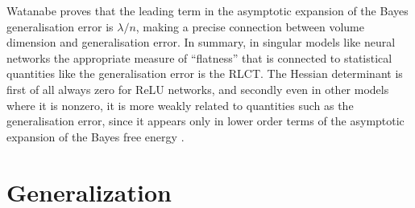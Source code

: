 \documentclass{article} %
\begin{document}
Watanabe proves that the leading term in the asymptotic expansion of the Bayes generalisation error is $\lambda/n$, making a precise connection between volume dimension and generalisation error. In summary, in singular models like neural networks the appropriate measure of ``flatness'' that is connected to statistical quantities like the generalisation error is the RLCT. The Hessian determinant is first of all always zero for ReLU networks, and secondly even in other models where it is nonzero, it is more weakly related to quantities such as the generalisation error, since it appears only in lower order terms of the asymptotic expansion of the Bayes free energy \citep[\S 3.1]{Balasubramanian:1996cond.mat..1030B}. 



\section{Generalization}\label{section:gen_error}
\end{document}
